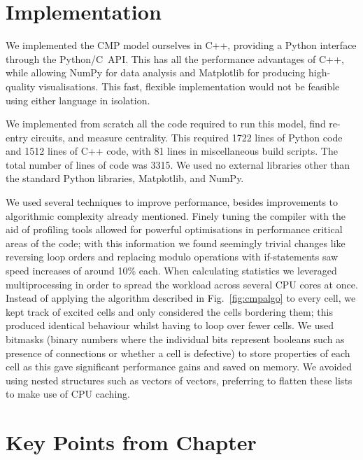 \clearpage
\section{Implementation} \label{sec:cmpimpl}

We implemented the CMP model ourselves in C++, providing a Python interface through the Python/C~API. This has all the performance advantages of C++, while allowing NumPy for data analysis and Matplotlib for producing high-quality visualisations. This fast, flexible implementation would not be feasible using either language in isolation.

We implemented from scratch all the code required to run this model, find re-entry circuits, and measure centrality. This required 1722 lines of Python code and 1512 lines of C++ code, with 81 lines in miscellaneous build scripts. The total number of lines of code was 3315. We used no external libraries other than the standard Python libraries, Matplotlib, and NumPy.

We used several techniques to improve performance, besides improvements to algorithmic complexity already mentioned. Finely tuning the compiler with the aid of profiling tools allowed for powerful optimisations in performance critical areas of the code; with this information we found seemingly trivial changes like reversing loop orders and replacing modulo operations with if-statements saw speed increases of around 10\% each. When calculating statistics we leveraged multiprocessing in order to spread the workload across several CPU cores at once. Instead of applying the algorithm described in Fig.~\ref{fig:cmpalgo} to every cell, we kept track of excited cells and only considered the cells bordering them; this produced identical behaviour whilst having to loop over fewer cells. We used bitmasks (binary numbers where the individual bits represent booleans such as presence of connections or whether a cell is defective) to store properties of each cell as this gave significant performance gains and saved on memory. We avoided using nested structures such as vectors of vectors, preferring to flatten these lists to make use of CPU caching.

\section{Key Points from Chapter \thechapter}

